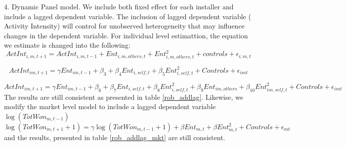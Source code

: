 \documentclass[msom,blindrev]{informs3}
\begin{document}
4. Dynamic Panel model. We include both fixed effect for each installer and include a lagged dependent variable. The inclusion of lagged dependent variable ( Activity Intensity) will control for unobserved heterogeneity that may influence changes in the dependent variable. For individual level estimattion, the equation we estimate is changed into the following: 
\begin{equation}
    ActInt_{i,m,t+1}=ActInt_{i,m,t-1}+Ent_{i,m,others,t}+Ent_{i,m,others,t}^2+  
    controls+\epsilon_{i,m,t} 
\end{equation}

\begin{equation}
    ActInt_{im,t+1}=\gamma Ent_{im,t-1}+\beta_{3}+\beta_{4} Ent_{i,self,t}+\beta_{5}Ent_{i,self,t}^2+  
   Controls+\epsilon_{imt} 
   \label{model_ind}
\end{equation}

\begin{equation}
    ActInt_{im,t+1}=\gamma Ent_{im,t-1}+\beta_{6}+\beta_{7} Ent_{i,self,t}+\beta_{8}Ent_{i,self,t}^2+\beta_{9}Ent_{im,others}+\beta_{10}Ent_{im,self,t}^2+  
   Controls+\epsilon_{imt} 
   \label{model_ind}
\end{equation}
The results are still consistent as presented in table \ref{rob_addlag}. 
Likewise, we modify the market level model to include a lagged dependent variable $\log(TotWon_{m,t-1})$
\begin{equation}
    \log(TotWon_{m,t+1}+1)=\gamma \log(TotWon_{m,t-1}+1)+\beta Ent_{m,t}+\beta Ent_{m,t}^2+Controls+\epsilon_{mt}
\end{equation} 
and the results, presented in table \ref{rob_addlag_mkt} are still consistent. 
\end{document}
